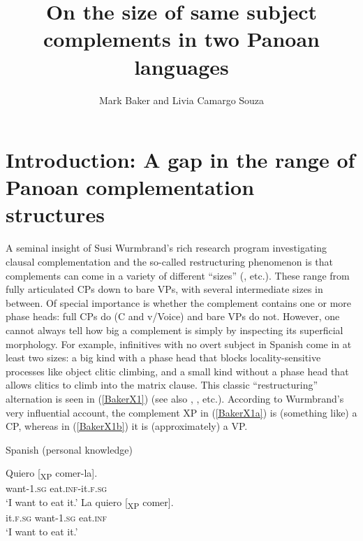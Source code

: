 \documentclass[output=paper]{langscibook}
\author{Mark Baker\affiliation{Rutgers University} and Livia Camargo Souza\affiliation{Rutgers University}}
\title{On the size of same subject complements in two Panoan languages}
\begin{document}
\renewcommand{\sc}[1]{\textsc{#1}}
\maketitle

\section{Introduction: A gap in the range of Panoan complementation structures}\label{sec:baker:1}
\begin{sloppypar}
A seminal insight of Susi Wurmbrand’s rich research program investigating clausal complementation and the so-called restructuring phenomenon is that complements can come in a variety of different “sizes” (\citealt{wurmbrand2001infinitives}, etc.). These range from fully articulated CPs down to bare VPs, with several intermediate sizes in between. Of special importance is whether the complement contains one or more phase heads: full CPs do (C and v/Voice) and bare VPs do not. However, one cannot always tell how big a complement is simply by inspecting its superficial morphology. For example, infinitives with no overt subject in Spanish come in at least two sizes: a big kind with a phase head that blocks locality-sensitive processes like object clitic climbing, and a small kind without a phase head that allows clitics to climb into the matrix clause. This classic “restructuring” alternation is seen in (\ref{BakerX1}) (see also \citealt{rizzi1982issues}, \citealt{burzio1986italian}, etc.). According to Wurmbrand’s very influential account, the complement XP in (\ref{BakerX1a}) is (something like) a CP, whereas in (\ref{BakerX1b}) it is (approximately) a VP.
\end{sloppypar}

\begin{exe}
    \ex Spanish (personal knowledge)\label{BakerX1}
	    \begin{xlist}
			\ex \label{BakerX1a}
			\gll Quiero [\textsubscript{XP }comer-la].\\
			        want-1.\textsc{sg} eat.\textsc{inf}-it.\textsc{f.sg}\\
			    \glt `I want to eat it.'
			\ex \label{BakerX1b}
			\gll La quiero [\textsubscript{XP }comer].\\
			        it.\textsc{f.sg} want-1.\textsc{sg} eat.\textsc{inf}\\
			    \glt `I want to eat it.'
		\end{xlist}
\end{exe}
\end{document}
